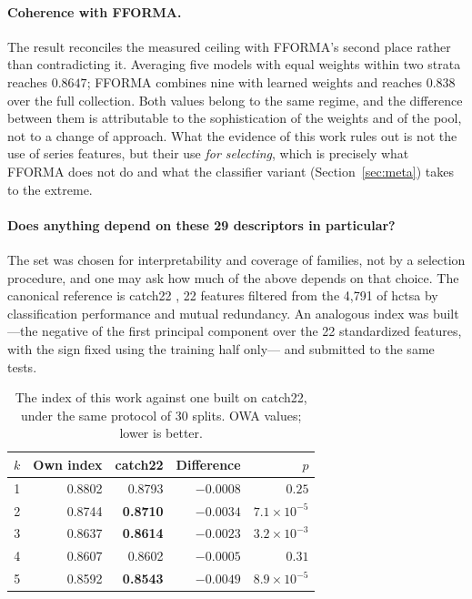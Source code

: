 \paragraph{Coherence with FFORMA.} The result reconciles the measured ceiling with
FFORMA's second place rather than contradicting it. Averaging five models with equal
weights within two strata reaches $0.8647$; FFORMA combines nine with learned weights and
reaches $0.838$ over the full collection. Both values belong to the same regime, and the
difference between them is attributable to the sophistication of the weights and of the
pool, not to a change of approach. What the evidence of this work rules out is not the use
of series features, but their use \emph{for selecting}, which is precisely what FFORMA
does not do and what the classifier variant (Section~\ref{sec:meta}) takes to the extreme.

\paragraph{Does anything depend on these 29 descriptors in particular?} The set was
chosen for interpretability and coverage of families, not by a selection procedure, and
one may ask how much of the above depends on that choice. The canonical reference is
catch22 \cite{lubba2019}, 22 features filtered from the 4{,}791 of hctsa by classification
performance and mutual redundancy. An analogous index was built ---the negative of the
first principal component over the 22 standardized features, with the sign fixed using the
training half only--- and submitted to the same tests.

\begin{table}[htbp]
\centering
\caption{The index of this work against one built on catch22, under the same protocol of
30 splits. OWA values; lower is better.}
\label{tab:catch22}
\begin{tabular}{crrrr}
\toprule
$k$ & \textbf{Own index} & \textbf{catch22} & \textbf{Difference} & \textbf{$p$} \\
\midrule
1 & 0.8802 & 0.8793 & $-0.0008$ & $0.25$ \\
2 & 0.8744 & \textbf{0.8710} & $-0.0034$ & $7.1\times10^{-5}$ \\
3 & 0.8637 & \textbf{0.8614} & $-0.0023$ & $3.2\times10^{-3}$ \\
4 & 0.8607 & 0.8602 & $-0.0005$ & $0.31$ \\
5 & 0.8592 & \textbf{0.8543} & $-0.0049$ & $8.9\times10^{-5}$ \\
\bottomrule
\end{tabular}
\end{table}

